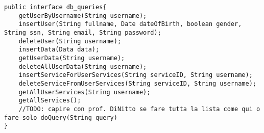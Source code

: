 \documentclass[../../DD.tex]{subfiles}
\begin{document}
\begin{lstlisting}
public interface db_queries{
	getUserByUsername(String username);
	insertUser(String fullname, Date dateOfBirth, boolean gender, String ssn, String email, String password);
	deleteUser(String username);
	insertData(Data data);
	getUserData(String username);
	deleteAllUserData(String username);
	insertServiceForUserServices(String serviceID, String username);
	deleteServiceFromUserServices(String serviceID, String username);
	getAllUserServices(String username);
	getAllServices();
	//TODO: capire con prof. DiNitto se fare tutta la lista come qui o fare solo doQuery(String query)
}
	\end{lstlisting}
	
\end{document}

